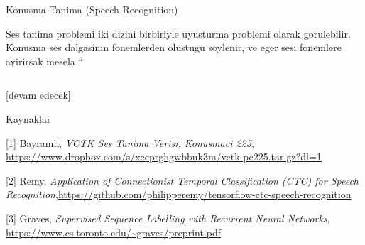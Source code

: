 \documentclass[12pt,fleqn]{article}\usepackage{../../common}
\begin{document}
Konusma Tanima (Speech Recognition)

Ses tanima problemi iki dizini birbiriyle uyusturma problemi olarak
gorulebilir. Konusma ses dalgasinin fonemlerden olustugu soylenir, ve eger
sesi fonemlere ayirirsak mesela ``




\inputminted[fontsize=\footnotesize]{python}{train.py}


[devam edecek]

Kaynaklar

[1] Bayramli, {\em VCTK Ses Tanima Verisi, Konusmaci 225}, \url{https://www.dropbox.com/s/xecprghgwbbuk3m/vctk-pc225.tar.gz?dl=1}

[2] Remy, {\em Application of Connectionist Temporal Classification (CTC) for Speech Recognition},\url{https://github.com/philipperemy/tensorflow-ctc-speech-recognition}

[3] Graves, {\em Supervised Sequence Labelling with Recurrent Neural Networks}, \url{https://www.cs.toronto.edu/~graves/preprint.pdf}
\end{document}
